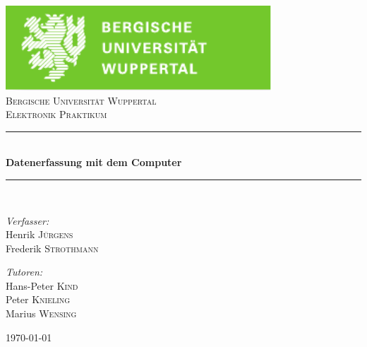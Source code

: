 \documentclass[12pt,a4paper]{article}
\begin{document}


\begin{titlepage}

\begin{center}
\includegraphics[width=0.75\textwidth]{logo.pdf}\\[1cm]    	%

\textsc{\LARGE Bergische Universität Wuppertal}\\[1.5cm]	%

\textsc{\Large Elektronik Praktikum}\\[0.5cm]				%


\newcommand{\HRule}{\rule{\linewidth}{0.5mm}}
\HRule \\[0.4cm]
{ \huge \bfseries Datenerfassung mit dem Computer}\\[0.4cm]				%

\HRule \\[1.5cm]

\begin{minipage}{0.4\textwidth}
\begin{flushleft} \large
\emph{Verfasser:}\\
Henrik \textsc{Jürgens} \\
Frederik \textsc{Strothmann}
\end{flushleft}
\end{minipage}
\hfill
\begin{minipage}{0.4\textwidth}
\begin{flushright} \large
\emph{Tutoren:} \\
Hans-Peter \textsc{Kind} \\
Peter \textsc{Knieling} \\
Marius \textsc{Wensing}
\end{flushright}
\end{minipage}

\vfill

{\large \today}

\end{center}

\end{titlepage}
\end{document}
